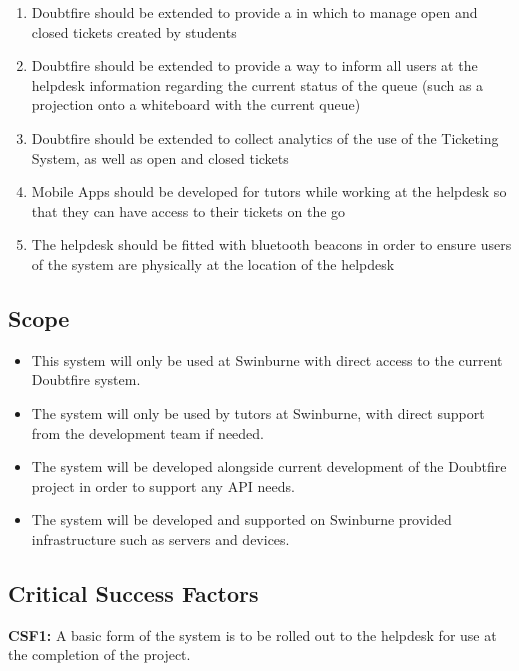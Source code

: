 \documentclass[a4paper,12pt]{article}
\providecommand{\tightlist}{%
  \setlength{\itemsep}{0pt}\setlength{\parskip}{0pt}}
\begin{document}
\begin{enumerate}
\tightlist
\def\labelenumi{\arabic{enumi}.}
\item
  Doubtfire should be extended to provide a in which to manage open and
  closed tickets created by students
\item
  Doubtfire should be extended to provide a way to inform all users at
  the helpdesk information regarding the current status of the queue
  (such as a projection onto a whiteboard with the current queue)
\item
  Doubtfire should be extended to collect analytics of the use of the
  Ticketing System, as well as open and closed tickets
\item
  Mobile Apps should be developed for tutors while working at the
  helpdesk so that they can have access to their tickets on the go
\item
  The helpdesk should be fitted with bluetooth beacons in order to
  ensure users of the system are physically at the location of the
  helpdesk
\end{enumerate}

\subsection{Scope}\label{scope}

\begin{itemize}
\tightlist
\item
  This system will only be used at Swinburne with direct access to the
  current Doubtfire system.
\item
  The system will only be used by tutors at Swinburne, with direct
  support from the development team if needed.
\item
  The system will be developed alongside current development of the
  Doubtfire project in order to support any API needs.
\item
  The system will be developed and supported on Swinburne provided
  infrastructure such as servers and devices.
\end{itemize}

\subsection{Critical Success Factors}\label{critical-success-factors}

\textbf{CSF1:} A basic form of the system is to be rolled out to the
helpdesk for use at the completion of the project.
\end{document}
